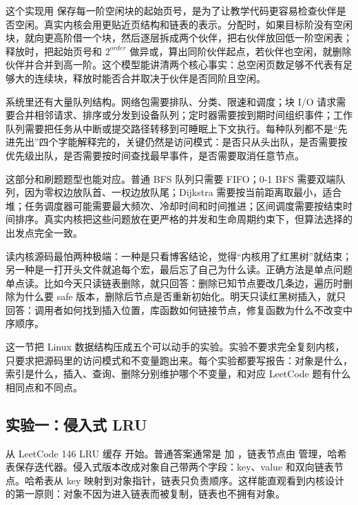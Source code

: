 这个实现用  保存每一阶空闲块的起始页号，是为了让教学代码更容易检查伙伴是否空闲。真实内核会用更贴近页结构和链表的表示。分配时，如果目标阶没有空闲块，就向更高阶借一个块，然后逐层拆成两个伙伴，把右伙伴放回低一阶空闲表；释放时，把起始页号和 \ensuremath{2^{order}} 做异或，算出同阶伙伴起点，若伙伴也空闲，就删除伙伴并合并到高一阶。这个模型能讲清两个核心事实：总空闲页数足够不代表有足够大的连续块，释放时能否合并取决于伙伴是否同阶且空闲。


系统里还有大量队列结构。网络包需要排队、分类、限速和调度；块 I/O 请求需要合并相邻请求、排序或分发到设备队列；定时器需要按到期时间组织事件；工作队列需要把任务从中断或提交路径转移到可睡眠上下文执行。每种队列都不是“先进先出”四个字能解释完的，关键仍然是访问模式：是否只从头出队，是否需要按优先级出队，是否需要按时间查找最早事件，是否需要取消任意节点。

这部分和刷题题型也能对应。普通 BFS 队列只需要 FIFO；0-1 BFS 需要双端队列，因为零权边放队首、一权边放队尾；Dijkstra 需要按当前距离取最小，适合堆；任务调度器可能需要最大频次、冷却时间和时间推进；区间调度需要按结束时间排序。真实内核把这些问题放在更严格的并发和生命周期约束下，但算法选择的出发点完全一致。


读内核源码最怕两种极端：一种是只看博客结论，觉得“内核用了红黑树”就结束；另一种是一打开头文件就追每个宏，最后忘了自己为什么读。正确方法是单点问题单点读。比如今天只读链表删除，就只回答：删除已知节点要改几条边，遍历时删除为什么要 safe 版本，删除后节点是否重新初始化。明天只读红黑树插入，就只回答：调用者如何找到插入位置，库函数如何链接节点，修复函数为什么不改变中序顺序。


这一节把 Linux 数据结构压成五个可以动手的实验。实验不要求完全复刻内核，只要求把源码里的访问模式和不变量跑出来。每个实验都要写报告：对象是什么，索引是什么，插入、查询、删除分别维护哪个不变量，和对应 LeetCode 题有什么相同点和不同点。

\subsection{实验一：侵入式 LRU}

从 LeetCode 146 LRU 缓存 开始。普通答案通常是  加 ，链表节点由  管理，哈希表保存迭代器。侵入式版本改成对象自己带两个字段：key、value 和双向链表节点。哈希表从 key 映射到对象指针，链表只负责顺序。这样能直观看到内核设计的第一原则：对象不因为进入链表而被复制，链表也不拥有对象。

